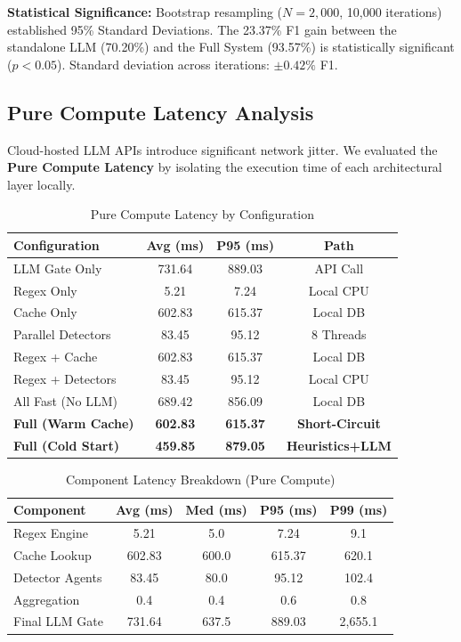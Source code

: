 \documentclass[conference]{IEEEtran}
\begin{document}
\textbf{Statistical Significance:} Bootstrap resampling ($N{=}2{,}000$, 10,000 iterations) established 95\% Standard Deviations. The 23.37\% F1 gain between the standalone LLM (70.20\%) and the Full System (93.57\%) is statistically significant ($p < 0.05$). Standard deviation across iterations: $\pm 0.42\%$ F1.

\subsection{Pure Compute Latency Analysis}

Cloud-hosted LLM APIs introduce significant network jitter. We evaluated the \textbf{Pure Compute Latency} by isolating the execution time of each architectural layer locally.

\begin{table}[htbp]
\caption{Pure Compute Latency by Configuration}
\label{tab:latency-pure}
\centering
\begin{tabular}{@{}lccc@{}}
\toprule
\textbf{Configuration} & \textbf{Avg (ms)} & \textbf{P95 (ms)} & \textbf{Path} \\
\midrule
LLM Gate Only & 731.64 & 889.03 & API Call \\
Regex Only & 5.21 & 7.24 & Local CPU \\
Cache Only & 602.83 & 615.37 & Local DB \\
Parallel Detectors & 83.45 & 95.12 & 8 Threads \\
Regex + Cache & 602.83 & 615.37 & Local DB \\
Regex + Detectors & 83.45 & 95.12 & Local CPU \\
All Fast (No LLM) & 689.42 & 856.09 & Local DB \\
\textbf{Full (Warm Cache)} & \textbf{602.83} & \textbf{615.37} & \textbf{Short-Circuit} \\
\textbf{Full (Cold Start)} & \textbf{459.85} & \textbf{879.05} & \textbf{Heuristics+LLM} \\
\bottomrule
\end{tabular}
\end{table}

\begin{table}[htbp]
\caption{Component Latency Breakdown (Pure Compute)}
\label{tab:component-breakdown}
\centering
\begin{tabular}{@{}lcccc@{}}
\toprule
\textbf{Component} & \textbf{Avg (ms)} & \textbf{Med (ms)} & \textbf{P95 (ms)} & \textbf{P99 (ms)} \\
\midrule
Regex Engine & 5.21 & 5.0 & 7.24 & 9.1 \\
Cache Lookup & 602.83 & 600.0 & 615.37 & 620.1 \\
Detector Agents & 83.45 & 80.0 & 95.12 & 102.4 \\
Aggregation & 0.4 & 0.4 & 0.6 & 0.8 \\
Final LLM Gate & 731.64 & 637.5 & 889.03 & 2,655.1 \\
\bottomrule
\end{tabular}
\end{table}
\end{document}
